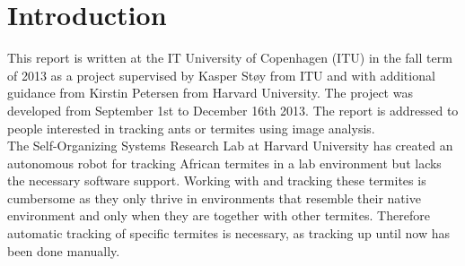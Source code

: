 
\section{Introduction}

% 
% 

This report is written at the IT University of Copenhagen (ITU) in the fall term of 2013 as a project supervised by Kasper Støy from ITU and with additional guidance from Kirstin Petersen from Harvard University. The project was developed from September 1st to December 16th 2013. The report is addressed to people interested in tracking ants or termites using image analysis. \\



The Self-Organizing Systems Research Lab at Harvard University has created an autonomous robot for tracking African termites in a lab
environment but lacks the necessary software support. Working with and tracking these termites is cumbersome as they only thrive in
environments that resemble their native environment and only when they are together with other termites. Therefore automatic tracking of
specific termites is necessary, as tracking up until now has been done manually. \\

